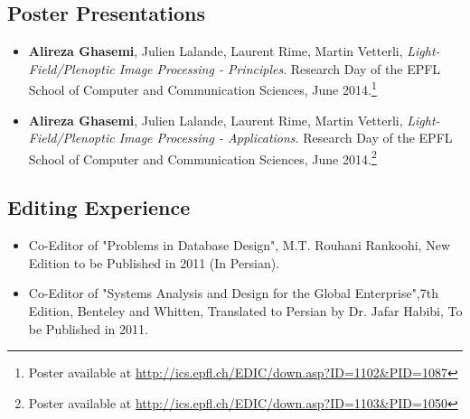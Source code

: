 \documentclass[a4paper]{article}
\theoremstyle{definition}
\begin{document}
\subsection{Poster Presentations}
\begin{itemize}
	\item \textbf{Alireza Ghasemi}, Julien Lalande, Laurent Rime, Martin Vetterli, \textit{Light-Field/Plenoptic Image Processing - Principles}.  Research Day of the EPFL School of Computer and Communication Sciences, June 2014.\footnote{Poster available at \url{http://ics.epfl.ch/EDIC/down.asp?ID=1102&PID=1087}}
	\item \textbf{Alireza Ghasemi}, Julien Lalande, Laurent Rime, Martin Vetterli, \textit{Light-Field/Plenoptic Image Processing - Applications}.  Research Day of the EPFL School of Computer and Communication Sciences, June 2014.\footnote{Poster available at \url{http://ics.epfl.ch/EDIC/down.asp?ID=1103&PID=1050}}
\end{itemize}


\subsection{Editing Experience}
\begin{itemize}
\item Co-Editor of "Problems in Database Design", M.T. Rouhani Rankoohi, New Edition to be Published in 2011 (In Persian).
\item Co-Editor of "Systems Analysis and Design for the Global Enterprise",7th Edition, Benteley and Whitten, Translated to Persian by Dr. Jafar Habibi, To be Published in 2011.
\end{itemize}
\end{document}
